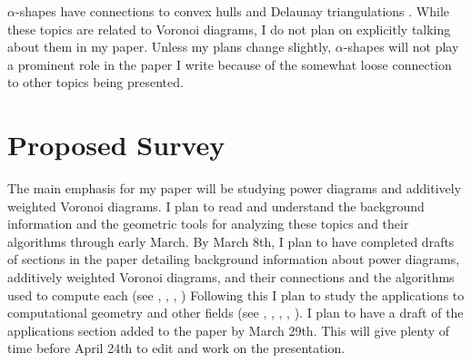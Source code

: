 \documentclass[a4paper]{article}
\begin{document}
$\alpha$-shapes have connections to convex hulls and Delaunay triangulations \cite{edelsbrunner_alpha}. While these topics are related to Voronoi
diagrams, I do not plan on explicitly talking about them in my paper. Unless my plans change slightly, $\alpha$-shapes will not play a prominent role
in the paper I write because of the somewhat loose connection to other topics being presented.

\section{Proposed Survey}

The main emphasis for my paper will be studying power diagrams and additively weighted Voronoi diagrams. I plan to read and understand the background
information and the geometric tools for analyzing these topics and their algorithms through early March. By March 8th, I plan to have completed drafts
of sections in the paper detailing background information about power diagrams, additively weighted Voronoi diagrams, and their connections and the
algorithms used to compute each (see \cite{aurenhammer_power}, \cite{aurenhammer_survey}, \cite{aurenhammer_additive}, \cite{fortune_sweepline})
Following this I plan to study the applications to computational geometry and other fields (see \cite{aurenhammer_discs}, \cite{brieden_clustering},
\cite{brieden_farmland}, \cite{imai_power}, \cite{fluids}). I plan to have a draft of the applications section added to the paper by March 29th. This
will give plenty of time before April 24th to edit and work on the presentation.

\printbibliography
\end{document}
